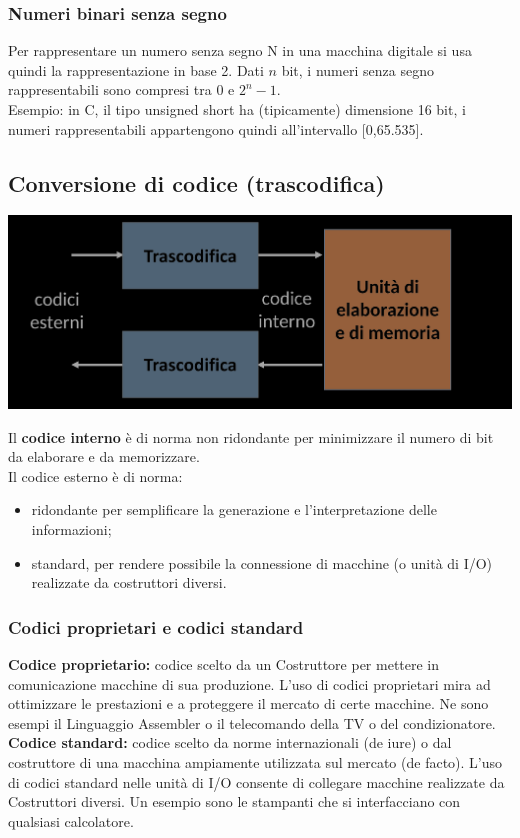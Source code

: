\documentclass{article}
\begin{document}
\subsubsection{Numeri binari senza segno}
Per rappresentare un numero senza segno N in una macchina digitale si usa quindi la rappresentazione in base 2. Dati $n$ bit, i numeri senza segno rappresentabili sono compresi tra $0$ e $2^{n} - 1$.\\
Esempio: in C, il tipo {\selectfont unsigned short} ha (tipicamente) dimensione 16 bit, i numeri rappresentabili appartengono quindi all’intervallo [0,65.535].
\subsection{Conversione di codice (trascodifica)}
\begin{center}
    \includegraphics[scale=0.33]{trascod.png}
\end{center}
Il \textbf{codice interno} è di norma non ridondante per minimizzare il numero di bit da elaborare e da memorizzare.\\
Il codice esterno è di norma:
\begin{itemize}
    \item ridondante per semplificare la generazione e l'interpretazione delle informazioni;
    \item standard, per rendere possibile la connessione di macchine (o unità di I/O) realizzate da costruttori diversi.
\end{itemize}
\subsubsection{Codici proprietari e codici standard}
\textbf{Codice proprietario:} codice scelto da un Costruttore per mettere in comunicazione macchine di sua produzione. L'uso di codici proprietari mira ad ottimizzare le prestazioni e a proteggere il mercato di certe macchine. Ne sono esempi il Linguaggio Assembler o il telecomando della TV o del condizionatore.
\vspace{0.1cm}\\
\textbf{Codice standard:} codice scelto da norme internazionali (de iure) o dal costruttore di una macchina ampiamente utilizzata sul mercato (de facto). L'uso di codici standard nelle unità di I/O consente di collegare macchine realizzate da Costruttori diversi. Un esempio sono le stampanti che si interfacciano con qualsiasi calcolatore.
\end{document}
